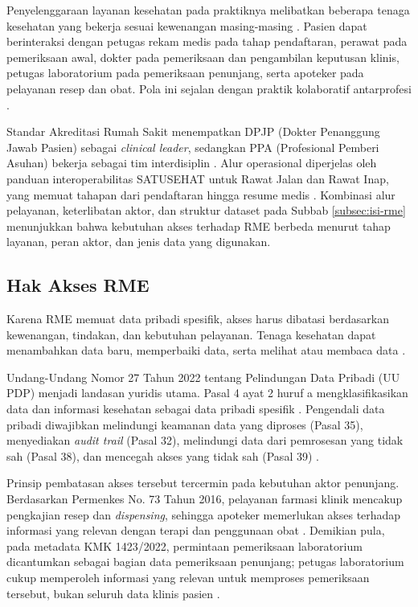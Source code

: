 Penyelenggaraan layanan kesehatan pada praktiknya melibatkan beberapa tenaga kesehatan yang bekerja sesuai kewenangan masing-masing \autocite{who2010_interprofessional_collaborative_practice}. Pasien dapat berinteraksi dengan petugas rekam medis pada tahap pendaftaran, perawat pada pemeriksaan awal, dokter pada pemeriksaan dan pengambilan keputusan klinis, petugas laboratorium pada pemeriksaan penunjang, serta apoteker pada pelayanan resep dan obat. Pola ini sejalan dengan praktik kolaboratif antarprofesi \autocite{srinivas2023synergistic}.

Standar Akreditasi Rumah Sakit menempatkan DPJP (Dokter Penanggung Jawab Pasien) sebagai \textit{clinical leader}, sedangkan PPA (Profesional Pemberi Asuhan) bekerja sebagai tim interdisiplin \autocite{kmk1128_2022}. Alur operasional diperjelas oleh panduan interoperabilitas SATUSEHAT untuk Rawat Jalan dan Rawat Inap, yang memuat tahapan dari pendaftaran hingga resume medis \autocite{satusehat_rme_rawat_jalan,satusehat_rawat_inap_new}. Kombinasi alur pelayanan, keterlibatan aktor, dan struktur dataset pada Subbab \ref{subsec:isi-rme} menunjukkan bahwa kebutuhan akses terhadap RME berbeda menurut tahap layanan, peran aktor, dan jenis data yang digunakan.

\subsection{Hak Akses RME}
\label{subsec:hak-akses-rme}

Karena RME memuat data pribadi spesifik, akses harus dibatasi berdasarkan kewenangan, tindakan, dan kebutuhan pelayanan. Tenaga kesehatan dapat menambahkan data baru, memperbaiki data, serta melihat atau membaca data \autocite{permenkes24_2022}.

Undang-Undang Nomor 27 Tahun 2022 tentang Pelindungan Data Pribadi (UU PDP) menjadi landasan yuridis utama. Pasal 4 ayat 2 huruf a mengklasifikasikan data dan informasi kesehatan sebagai data pribadi spesifik \autocite{uu27-2022-pdp}. Pengendali data pribadi diwajibkan melindungi keamanan data yang diproses (Pasal 35), menyediakan \textit{audit trail} (Pasal 32), melindungi data dari pemrosesan yang tidak sah (Pasal 38), dan mencegah akses yang tidak sah (Pasal 39) \autocite{uu27-2022-pdp}.

Prinsip pembatasan akses tersebut tercermin pada kebutuhan aktor penunjang. Berdasarkan Permenkes No. 73 Tahun 2016, pelayanan farmasi klinik mencakup pengkajian resep dan \textit{dispensing}, sehingga apoteker memerlukan akses terhadap informasi yang relevan dengan terapi dan penggunaan obat \autocite{permenkes73_2016}. Demikian pula, pada metadata KMK 1423/2022, permintaan pemeriksaan laboratorium dicantumkan sebagai bagian data pemeriksaan penunjang; petugas laboratorium cukup memperoleh informasi yang relevan untuk memproses pemeriksaan tersebut, bukan seluruh data klinis pasien \autocite{kemenkes1423-2022}.
